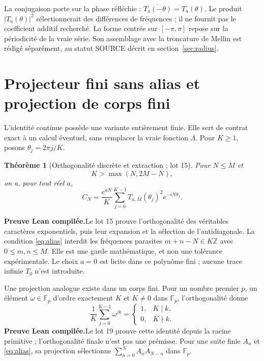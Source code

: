 \documentclass[11pt,a4paper]{article}
\newtheorem{theorem}{Théorème}[section]
\theoremstyle{remark}
\newcommand{\Lam}{\Lambda}
\newcommand{\Z}{\mathbb Z}
\newcommand{\paid}{\textbf{Preuve Lean compilée.}\space}
\begin{document}
La conjugaison porte sur la phase réfléchie :
$\overline{T_a(-\theta)}=T_a(\theta)$. Le produit $|T_a(\theta)|^2$
sélectionnerait des différences de fréquences ; il ne fournit pas le
coefficient additif recherché. La forme centrée sur $[-\pi,\pi]$ repose sur
la périodicité de la vraie série. Son assemblage avec la troncature de Mellin
est rédigé séparément, au statut SOURCE décrit en section~\ref{sec:radius}.

\clearpage
\section{Projecteur fini sans alias et projection de corps fini}\label{sec:finite}
L'identité continue possède une variante entièrement finie. Elle sert de
contrat exact à un calcul éventuel, sans remplacer la vraie fonction $\Lam$.
Pour $K\ge1$, posons $\theta_j=2\pi j/K$.

\begin{theorem}[Orthogonalité discrète et extraction ; lot 15]
Pour $N\le M$ et
\begin{equation}\label{eq:alias}
K>\max(N,2M-N),
\end{equation}
on a, pour tout réel $a$,
\begin{equation}\label{eq:discrete}
C_N=\frac{e^{aN}}{K}\sum_{j=0}^{K-1}
T_{a,M}(\theta_j)^2e^{-iN\theta_j}.
\end{equation}
\end{theorem}
\paid Le lot 15 prouve l'orthogonalité des véritables caractères
exponentiels, puis leur expansion et la sélection de l'antidiagonale.
La condition \eqref{eq:alias} interdit les fréquences parasites
$m+n-N\in K\Z$ avec $0\le m,n\le M$. Elle est une garde mathématique,
et non une tolérance expérimentale. Le choix $a=0$ est licite dans ce
polynôme fini ; aucune trace infinie $T_0$ n'est introduite.

Une projection analogue existe dans un corps fini. Pour un nombre premier
$p$, un élément $\omega\in\mathbb F_p$ d'ordre exactement $K$ et
$K\ne0$ dans $\mathbb F_p$, l'orthogonalité donne
\[
\frac1K\sum_{j=0}^{K-1}\omega^{jk}
=\begin{cases}1,&K\mid k,\\0,&K\nmid k.\end{cases}
\]
\paid Le lot 19 prouve cette identité depuis la racine primitive ;
l'orthogonalité finale n'est pas une prémisse. Pour une suite finie $A_n$ et
\eqref{eq:alias}, sa projection sélectionne
$\sum_{n=0}^N A_nA_{N-n}$ dans $\mathbb F_p$.
\end{document}
